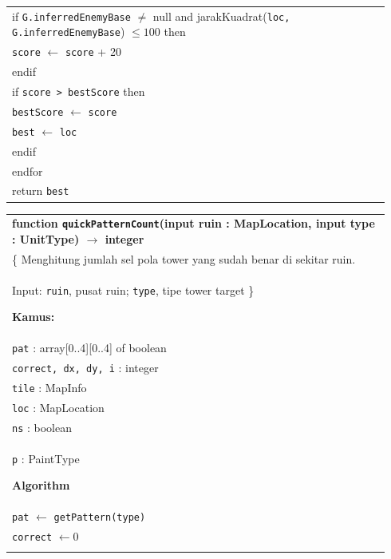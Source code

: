 \documentclass{article}
\newenvironment{pseudobox}
{
\centering
\begin{longtable}{|p{0.94\linewidth}|}
\hline
}
{
\\ \hline
\end{longtable}
\vspace{0.05cm}
}
\begin{document}
\begin{enumerate}[label=\alph*.]
\begin{enumerate}[label=\alph*.]
\begin{pseudobox}
\hspace*{3em}if \texttt{G.inferredEnemyBase} $\neq$ null and jarakKuadrat(\texttt{loc, G.inferredEnemyBase}) $\leq 100$ then \\
\hspace*{4.5em}\texttt{score} $\leftarrow$ \texttt{score} + 20 \\
\hspace*{3em}endif \\

\hspace*{3em}if \texttt{score > bestScore} then \\
\hspace*{4.5em}\texttt{bestScore} $\leftarrow$ \texttt{score} \\
\hspace*{4.5em}\texttt{best} $\leftarrow$ \texttt{loc} \\
\hspace*{3em}endif \\
\hspace*{1.5em}endfor \\

\hspace*{1.5em}return \texttt{best}
\end{pseudobox}

\begin{pseudobox}
\textbf{function \texttt{quickPatternCount}(input ruin : MapLocation, input type : UnitType) $\rightarrow$ integer} \\
\{ Menghitung jumlah sel pola tower yang sudah benar di sekitar ruin. \\
Input: \texttt{ruin}, pusat ruin; \texttt{type}, tipe tower target
\}

\textbf{Kamus:} \\
\hspace*{1.5em}\texttt{pat} : array[0..4][0..4] of boolean \\
\hspace*{1.5em}\texttt{correct, dx, dy, i} : integer \\
\hspace*{1.5em}\texttt{tile} : MapInfo \\
\hspace*{1.5em}\texttt{loc} : MapLocation \\
\hspace*{1.5em}\texttt{ns} : boolean \\
\hspace*{1.5em}\texttt{p} : PaintType

\textbf{Algorithm} \\
\hspace*{1.5em}\texttt{pat} $\leftarrow$ \texttt{getPattern(type)} \\
\hspace*{1.5em}\texttt{correct} $\leftarrow 0$ \\


\end{pseudobox}
\end{enumerate}
\end{enumerate}
\end{document}
